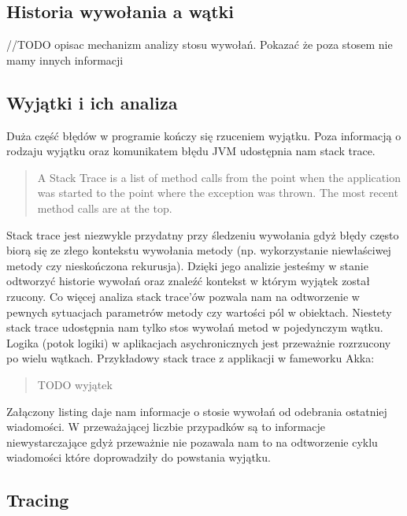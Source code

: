  

\subsection{Historia wywołania a wątki}

//TODO opisac mechanizm analizy stosu wywołań. Pokazać że poza stosem nie mamy innych informacji

\subsection{Wyjątki i ich analiza}
Duża część błędów w programie kończy się rzuceniem wyjątku. Poza informacją o rodzaju wyjątku oraz komunikatem błędu JVM udostępnia nam stack trace.

\begin{quote}
A Stack Trace is a list of method calls from the point when the application was started to the point where the exception was thrown. The most recent method calls are at the top.~\cite{javaProgramming}
\end{quote} 

Stack trace jest niezwykle przydatny przy śledzeniu wywołania gdyż błędy często biorą się ze złego kontekstu wywołania metody (np. wykorzystanie niewłaściwej metody czy nieskończona rekurusja). Dzięki jego analizie jesteśmy w stanie odtworzyć historie wywołań oraz znaleźć kontekst w którym wyjątek został rzucony. Co więcej analiza stack trace'ów pozwala nam na odtworzenie w pewnych sytuacjach parametrów metody czy wartości pól w obiektach.
Niestety stack trace udostępnia nam tylko stos wywołań metod w pojedynczym wątku. Logika (potok logiki) w aplikacjach asychronicznych jest przeważnie rozrzucony po wielu wątkach. Przykładowy stack trace z applikacji w fameworku Akka:

\begin{quote}
TODO wyjątek
\end{quote}

Załączony listing daje nam informacje o stosie wywołań od odebrania ostatniej wiadomości. W przeważającej liczbie przypadków są to informacje niewystarczające gdyż przeważnie nie pozawala nam to na odtworzenie cyklu wiadomości które doprowadziły do powstania wyjątku.

\subsection{Tracing}

